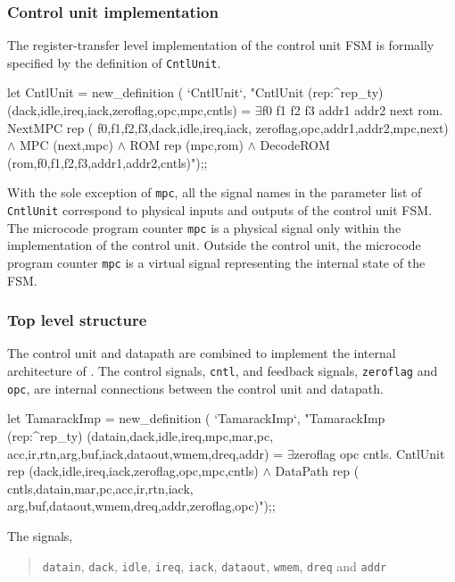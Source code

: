 \subsubsection{Control unit implementation}

The register-transfer level implementation of the control unit FSM
is formally specified by the definition of \verb"CntlUnit".

\begintt
let CntlUnit = new_definition (
  `CntlUnit`,
  "CntlUnit (rep:^rep_ty) (dack,idle,ireq,iack,zeroflag,opc,mpc,cntls) =
    \(\exists\)f0 f1 f2 f3 addr1 addr2 next rom.
      NextMPC rep (
        f0,f1,f2,f3,dack,idle,ireq,iack,
        zeroflag,opc,addr1,addr2,mpc,next) \(\wedge\)
      MPC (next,mpc) \(\wedge\)
      ROM rep (mpc,rom) \(\wedge\)
      DecodeROM (rom,f0,f1,f2,f3,addr1,addr2,cntls)");;
\endtt

With the sole exception of \verb"mpc",
all the signal names in the parameter list of \verb"CntlUnit"
correspond to physical inputs and outputs of the control unit FSM.
The microcode program counter \verb"mpc"
is a physical signal only within the implementation of the control unit.
Outside the control unit, the microcode program counter \verb"mpc"
is a virtual signal representing the internal state of the FSM.

\subsubsection{Top level structure}

The control unit and datapath are combined to implement the
internal architecture of \Tamarack.
The control signals, \verb"cntl", and feedback signals,
\verb"zeroflag" and \verb"opc", are internal connections
between the control unit and datapath.

\begintt
let TamarackImp = new_definition (
  `TamarackImp`,
  "TamarackImp (rep:^rep_ty)
    (datain,dack,idle,ireq,mpc,mar,pc,
     acc,ir,rtn,arg,buf,iack,dataout,wmem,dreq,addr) =
    \(\exists\)zeroflag opc cntls.
      CntlUnit rep (dack,idle,ireq,iack,zeroflag,opc,mpc,cntls) \(\wedge\)
      DataPath rep (
        cntls,datain,mar,pc,acc,ir,rtn,iack,
        arg,buf,dataout,wmem,dreq,addr,zeroflag,opc)");;
\endtt

The signals,

\begin{quote}
\verb"datain", \verb"dack", \verb"idle", \verb"ireq", \verb"iack",
\verb"dataout", \verb"wmem", \verb"dreq" and \verb"addr"
\end{quote}

